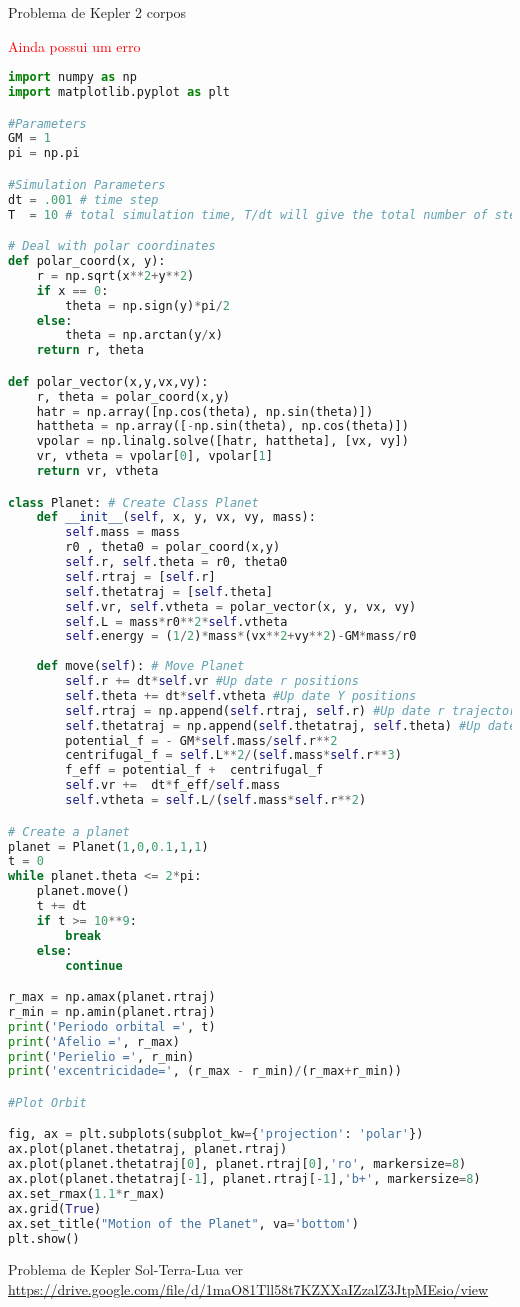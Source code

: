 Problema de Kepler 2 corpos

\textcolor{red}{Ainda possui um erro}

\begin{lstlisting}[language=Python, frame=lines,basicstyle=\footnotesize, caption={Orbitas: Problema de Kepler para 2 Corpos}, label={lst:2body-kepler}]
import numpy as np
import matplotlib.pyplot as plt

#Parameters
GM = 1
pi = np.pi

#Simulation Parameters
dt = .001 # time step
T  = 10 # total simulation time, T/dt will give the total number of steps

# Deal with polar coordinates
def polar_coord(x, y):
    r = np.sqrt(x**2+y**2)
    if x == 0:
        theta = np.sign(y)*pi/2
    else:
        theta = np.arctan(y/x)
    return r, theta

def polar_vector(x,y,vx,vy):
    r, theta = polar_coord(x,y)
    hatr = np.array([np.cos(theta), np.sin(theta)])
    hattheta = np.array([-np.sin(theta), np.cos(theta)])
    vpolar = np.linalg.solve([hatr, hattheta], [vx, vy])
    vr, vtheta = vpolar[0], vpolar[1]
    return vr, vtheta

class Planet: # Create Class Planet
    def __init__(self, x, y, vx, vy, mass):
        self.mass = mass
        r0 , theta0 = polar_coord(x,y)
        self.r, self.theta = r0, theta0
        self.rtraj = [self.r]
        self.thetatraj = [self.theta]
        self.vr, self.vtheta = polar_vector(x, y, vx, vy)
        self.L = mass*r0**2*self.vtheta
        self.energy = (1/2)*mass*(vx**2+vy**2)-GM*mass/r0
    
    def move(self): # Move Planet
        self.r += dt*self.vr #Up date r positions
        self.theta += dt*self.vtheta #Up date Y positions
        self.rtraj = np.append(self.rtraj, self.r) #Up date r trajectory
        self.thetatraj = np.append(self.thetatraj, self.theta) #Up date theta trajectory
        potential_f = - GM*self.mass/self.r**2
        centrifugal_f = self.L**2/(self.mass*self.r**3)
        f_eff = potential_f +  centrifugal_f
        self.vr +=  dt*f_eff/self.mass
        self.vtheta = self.L/(self.mass*self.r**2)

# Create a planet
planet = Planet(1,0,0.1,1,1)
t = 0
while planet.theta <= 2*pi: 
    planet.move()
    t += dt
    if t >= 10**9:
        break
    else:
        continue

r_max = np.amax(planet.rtraj)
r_min = np.amin(planet.rtraj)
print('Periodo orbital =', t)
print('Afelio =', r_max)
print('Perielio =', r_min)
print('excentricidade=', (r_max - r_min)/(r_max+r_min))

#Plot Orbit

fig, ax = plt.subplots(subplot_kw={'projection': 'polar'})
ax.plot(planet.thetatraj, planet.rtraj)
ax.plot(planet.thetatraj[0], planet.rtraj[0],'ro', markersize=8)
ax.plot(planet.thetatraj[-1], planet.rtraj[-1],'b+', markersize=8)
ax.set_rmax(1.1*r_max)
ax.grid(True)
ax.set_title("Motion of the Planet", va='bottom')
plt.show()

\end{lstlisting}

Problema de Kepler Sol-Terra-Lua
ver \\
\href{URL}{https://drive.google.com/file/d/1maO81Tll58t7KZXXaIZzalZ3JtpMEsio/view}
